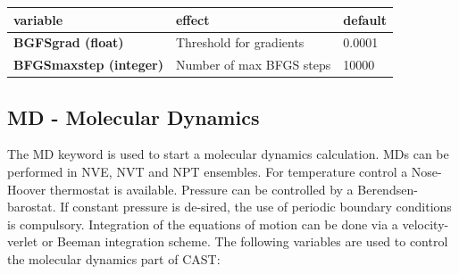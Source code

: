 \documentclass[10pt,a4paper]{article} %
\begin{document}
{	\begin{tabularx}{\textwidth}{l|l|l}
		variable & effect & default \\
		\hline
		\textbf{BGFSgrad (float)} & Threshold for gradients & 0.0001 \\
		\textbf{BFGSmaxstep (integer)} & Number of max BFGS steps & 10000 \\
	\end{tabularx}

	\subsection{MD - Molecular Dynamics}
	The MD keyword is used to start a molecular dynamics calculation. MDs can be performed in NVE, NVT and NPT ensembles. For temperature control a Nose-Hoover thermostat is available. Pressure can be controlled by a Berendsen-barostat. If constant pressure is de-sired, the use of periodic boundary conditions is compulsory. Integration of the equations of motion can be done via a velocity-verlet or Beeman integration scheme.
	The following variables are used to control the molecular dynamics part of CAST:\\~\\

}
\end{document}

